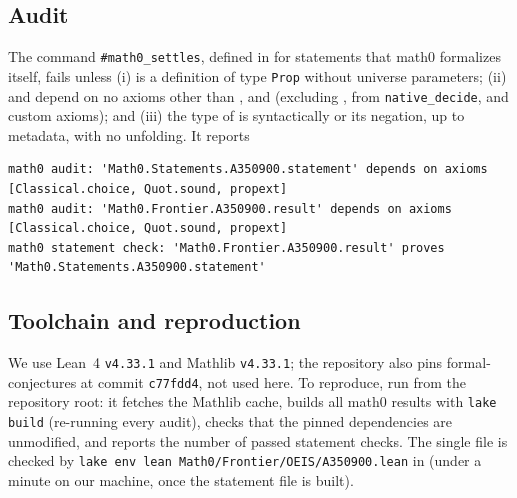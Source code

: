 \documentclass[11pt]{amsart}
\theoremstyle{plain}
\theoremstyle{definition}
\begin{document}
\subsection*{Audit}
The command \texttt{\#math0\_settles}, defined in  for statements that math0 formalizes itself, fails unless (i)  is a definition of type \texttt{Prop} without universe parameters; (ii)  and  depend on no axioms other than ,  and  (excluding ,  from \texttt{native\_decide}, and custom axioms); and (iii) the type of  is syntactically  or its negation, up to metadata, with no unfolding. It reports
\begin{lstlisting}[basicstyle=\ttfamily\scriptsize]
math0 audit: 'Math0.Statements.A350900.statement' depends on axioms [Classical.choice, Quot.sound, propext]
math0 audit: 'Math0.Frontier.A350900.result' depends on axioms [Classical.choice, Quot.sound, propext]
math0 statement check: 'Math0.Frontier.A350900.result' proves 'Math0.Statements.A350900.statement'
\end{lstlisting}

\subsection*{Toolchain and reproduction}
We use Lean~4 \cite{Lean4} \texttt{v4.33.1} and Mathlib \cite{Mathlib} \texttt{v4.33.1}; the repository also pins formal-conjectures \cite{FC} at commit \texttt{c77fdd4}, not used here.
To reproduce, run  from the repository root: it fetches the Mathlib cache, builds all math0 results with \texttt{lake build} (re-running every audit), checks that the pinned dependencies are unmodified, and reports the number of passed statement checks. The single file is checked by \texttt{lake env lean Math0/Frontier/OEIS/A350900.lean} in  (under a minute on our machine, once the statement file is built).
\end{document}

